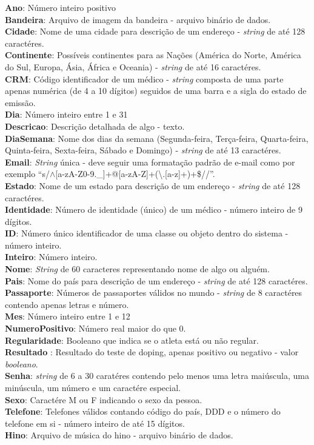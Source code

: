 \documentclass[12pt,a4paper]{article}
\begin{document}
    {\bf Ano}: Número inteiro positivo \\
    {\bf Bandeira}: Arquivo de imagem da bandeira - arquivo binário de dados. \\
    {\bf Cidade}: Nome de uma cidade para descrição de um endereço - {\it string} de até 128 caractéres. \\
    {\bf Continente}: Possíveis continentes para as Nações (América do Norte, América do Sul, Europa, Ásia, África e Oceania) - {\it string} de até 16 caractéres. \\
    {\bf CRM}: Código identificador de um médico - {\it string} composta de uma parte apenas numérica (de 4 a 10 dígitos) seguidos de uma barra e a sigla do estado de emissão. \\
    {\bf Dia}: Número inteiro entre 1 e 31 \\
    {\bf Descricao}: Descrição detalhada de algo - texto.\\
    {\bf DiaSemana}: Nome dos dias da semana (Segunda-feira, Terça-feira, Quarta-feira, Quinta-feira, Sexta-feira, Sábado e Domingo) - {\it string} de até 13 caractéres. \\
    {\bf Email}: {\it String} única - deve seguir uma formatação padrão de e-mail como por exemplo ``s/$\wedge$[a-zA-Z0-9.\_]+@[a-zA-Z]+(\textbackslash.[a-z]+)+\$//''. \\
    {\bf Estado}: Nome de um estado para descrição de um endereço - {\it string} de até 128 caractéres. \\
    {\bf Identidade}: Número de identidade (único) de um médico - número inteiro de 9 dígitos. \\
    {\bf ID}: Número único identificador de uma classe ou objeto dentro do sistema - número inteiro. \\
    {\bf Inteiro}: Número inteiro. \\
    {\bf Nome}: {\it String} de 60 caracteres representando nome de algo ou alguém. \\
    {\bf Pais}: Nome do país para descrição de um endereço - {\it string} de até 128 caractéres. \\
    {\bf Passaporte}: Números de passaportes válidos no mundo - {\it string} de 8 caractéres contendo apenas letras e número. \\
    {\bf Mes}: Número inteiro entre 1 e 12 \\
    {\bf NumeroPositivo}: Número real maior do que 0. \\
    {\bf Regularidade}: Booleano que indica se o atleta está ou não regular. \\
    {\bf Resultado} : Resultado do teste de doping, apenas positivo ou negativo - valor {\it booleano}. \\
    {\bf Senha}: {\it string} de 6 a 30 caratéres contendo pelo menos uma letra maiúscula, uma minúscula, um número e um caractére especial. \\
    {\bf Sexo}: Caractére M ou F indicando o sexo da pessoa. \\
    {\bf Telefone}: Telefones válidos contando código do país, DDD e o número do telefone em si - número inteiro de até 15 dígitos. \\
    {\bf Hino}: Arquivo de música do hino - arquivo binário de dados.\\
\end{document}
